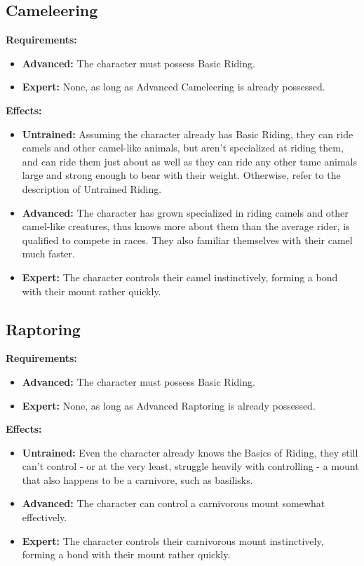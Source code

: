 \documentclass[openany,10pt,a4paper]{book}
\begin{document}
\subsection{Cameleering}
\begin{table}[!ht]
\centering
{}
\end{table}
\textbf{Requirements:}
\begin{itemize}
	\item \textbf{Advanced:} The character must possess Basic Riding.
	\item \textbf{Expert:} None, as long as Advanced Cameleering is already possessed.
\end{itemize}
\textbf{Effects:}
\begin{itemize}
	\item \textbf{Untrained:} Assuming the character already has Basic Riding, they can ride camels and other camel-like animals, but aren't specialized at riding them, and can ride them just about as well as they can ride any other tame animals large and strong enough to bear with their weight. Otherwise, refer to the description of Untrained Riding.
	\item \textbf{Advanced:} The character has grown specialized in riding camels and other camel-like creatures, thus knows more about them than the average rider, is qualified to compete in races. They also familiar themselves with their camel much faster.
	\item \textbf{Expert:} The character controls their camel instinctively, forming a bond with their mount rather quickly.
\end{itemize}\newpage
\subsection{Raptoring}
\begin{table}[!ht]
\centering
{}
\end{table}
\textbf{Requirements:}
\begin{itemize}
	\item \textbf{Advanced:} The character must possess Basic Riding.
	\item \textbf{Expert:} None, as long as Advanced Raptoring is already possessed.
\end{itemize}
\textbf{Effects:}
\begin{itemize}
	\item \textbf{Untrained:} Even the character already knows the Basics of Riding, they still can't control - or at the very least, struggle heavily with controlling - a mount that also happens to be a carnivore, such as basilisks.
	\item \textbf{Advanced:} The character can control a carnivorous mount somewhat effectively.
	\item \textbf{Expert:} The character controls their carnivorous mount instinctively, forming a bond with their mount rather quickly.
\end{itemize}\newpage
\end{document}
